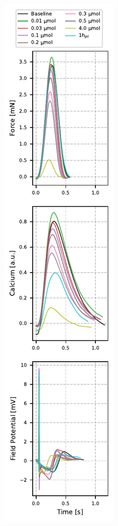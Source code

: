 \documentclass{report}
\begin{document}
\begin{figure}[h]
\begin{subfigure}[b]{0.3\textwidth}
                    \caption[E-4031 average contraction]{}
                    \label{fig:e4031-average}
                \end{subfigure}
                ~
                \begin{subfigure}[b]{0.3\textwidth}
                    \includegraphics[width=\textwidth, height=0.92\textheight]{plots/chapter_3/average_signals_nifedipine.pdf}

\end{subfigure}
\end{figure}
\end{document}
